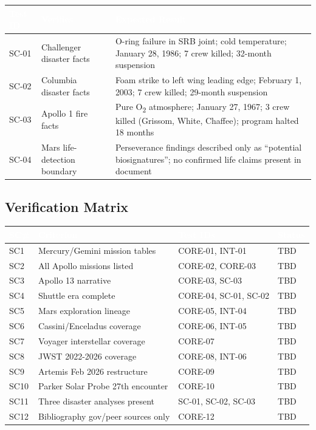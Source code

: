 \documentclass[11pt,letterpaper]{article}
\newcommand{\tableheader}[1]{\textbf{\sffamily\textcolor{white}{#1}}}
\begin{document}
\begin{center}
\begin{tabularx}{\textwidth}{L{1.5cm}L{3cm}X}
\toprule
{}
\tableheader{Test ID} & \tableheader{Verifies} & \tableheader{Expected Result} \\
\midrule
SC-01 & Challenger disaster facts & O-ring failure in SRB joint; cold temperature; January 28, 1986; 7 crew killed; 32-month suspension \\
SC-02 & Columbia disaster facts & Foam strike to left wing leading edge; February 1, 2003; 7 crew killed; 29-month suspension \\
SC-03 & Apollo 1 fire facts & Pure O\textsubscript{2} atmosphere; January 27, 1967; 3 crew killed (Grissom, White, Chaffee); program halted 18 months \\
SC-04 & Mars life-detection boundary & Perseverance findings described only as ``potential biosignatures''; no confirmed life claims present in document \\
\bottomrule
\end{tabularx}
\end{center}

\subsection{Verification Matrix}

\begin{center}
\begin{tabularx}{\textwidth}{L{1cm}L{4.5cm}L{2.5cm}C{1.5cm}}
\toprule
{}
\tableheader{SC\#} & \tableheader{Criterion} & \tableheader{Test IDs} & \tableheader{Status} \\
\midrule
SC1 & Mercury/Gemini mission tables & CORE-01, INT-01 & TBD \\
SC2 & All Apollo missions listed & CORE-02, CORE-03 & TBD \\
SC3 & Apollo 13 narrative & CORE-03, SC-03 & TBD \\
SC4 & Shuttle era complete & CORE-04, SC-01, SC-02 & TBD \\
SC5 & Mars exploration lineage & CORE-05, INT-04 & TBD \\
SC6 & Cassini/Enceladus coverage & CORE-06, INT-05 & TBD \\
SC7 & Voyager interstellar coverage & CORE-07 & TBD \\
SC8 & JWST 2022-2026 coverage & CORE-08, INT-06 & TBD \\
SC9 & Artemis Feb 2026 restructure & CORE-09 & TBD \\
SC10 & Parker Solar Probe 27th encounter & CORE-10 & TBD \\
SC11 & Three disaster analyses present & SC-01, SC-02, SC-03 & TBD \\
SC12 & Bibliography gov/peer sources only & CORE-12 & TBD \\
\bottomrule
\end{tabularx}
\end{center}
\end{document}
